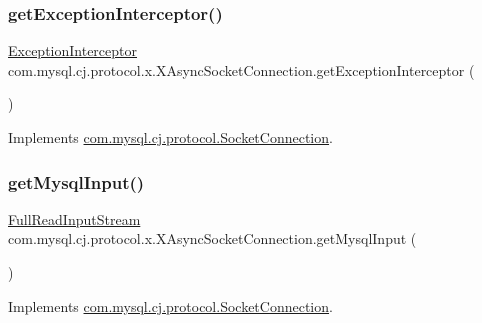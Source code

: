 \subsubsection{\texorpdfstring{get\+Exception\+Interceptor()}{getExceptionInterceptor()}}
{\footnotesize\ttfamily \mbox{\hyperlink{interfacecom_1_1mysql_1_1cj_1_1exceptions_1_1_exception_interceptor}{Exception\+Interceptor}} com.\+mysql.\+cj.\+protocol.\+x.\+X\+Async\+Socket\+Connection.\+get\+Exception\+Interceptor (\begin{DoxyParamCaption}{ }\end{DoxyParamCaption})}



Implements \mbox{\hyperlink{interfacecom_1_1mysql_1_1cj_1_1protocol_1_1_socket_connection_a4d5027b36a3d4147c685c2a3326fd153}{com.\+mysql.\+cj.\+protocol.\+Socket\+Connection}}.

\mbox{\label{classcom_1_1mysql_1_1cj_1_1protocol_1_1x_1_1_x_async_socket_connection_a780fb96617a64cb758ef75681f6dc3ab}} 
\subsubsection{\texorpdfstring{get\+Mysql\+Input()}{getMysqlInput()}}
{\footnotesize\ttfamily \mbox{\hyperlink{classcom_1_1mysql_1_1cj_1_1protocol_1_1_full_read_input_stream}{Full\+Read\+Input\+Stream}} com.\+mysql.\+cj.\+protocol.\+x.\+X\+Async\+Socket\+Connection.\+get\+Mysql\+Input (\begin{DoxyParamCaption}{ }\end{DoxyParamCaption})}



Implements \mbox{\hyperlink{interfacecom_1_1mysql_1_1cj_1_1protocol_1_1_socket_connection_acf79ea4de0d3d0054db3ae5446f0319c}{com.\+mysql.\+cj.\+protocol.\+Socket\+Connection}}.

\mbox{\label{classcom_1_1mysql_1_1cj_1_1protocol_1_1x_1_1_x_async_socket_connection_a233c917f720ee49857c160155fbd75dc}} 
